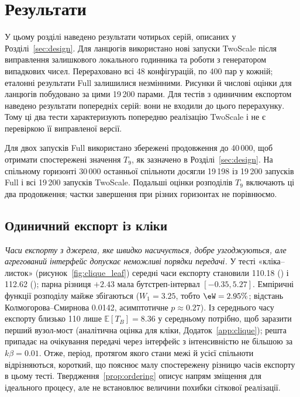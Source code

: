 \section{Результати}
\label{sec:results}

У цьому розділі наведено результати чотирьох серій, описаних у Розділі~\ref{sec:design}.
Для ланцюгів використано нові запуски TwoScale після виправлення залишкового локального годинника та роботи з генератором випадкових чисел. Перераховано всі 48 конфігурацій, по 400 пар у кожній; еталонні результати Full залишилися незмінними. Рисунки й числові оцінки для ланцюгів побудовано за цими 19\,200 парами.
Для тестів з одиничним експортом наведено результати попередніх серій: вони не входили до цього перерахунку. Тому ці два тести характеризують попередню реалізацію TwoScale і не є перевіркою її виправленої версії.

Для двох запусків Full використано збережені продовження до 40\,000, щоб отримати спостережені значення $T_9$, як зазначено в Розділі~\ref{sec:design}. На спільному горизонті 30\,000 останньої спільноти досягли 19\,198 із 19\,200 запусків Full і всі 19\,200 запусків TwoScale. Подальші оцінки розподілів $T_9$ включають ці два продовження; частки завершення при різних горизонтах не порівнюємо.

\subsection{Одиничний експорт із кліки}
\label{sec:res_clique}

\emph{Часи експорту з джерела, яке швидко насичується, добре узгоджуються, але агрегований інтерфейс допускає неможливі порядки передачі.} У тесті «кліка--листок» (рисунок~\ref{fig:clique_leaf}) середні часи експорту становили 110.18 (\Full{}) і 112.62 (\TS{}); парна різниця $+2.43$ мала бутстреп-інтервал $[-0.35,5.27]$. Емпіричні функції розподілу майже збігаються ($W_1=3.25$, тобто $\eW=2.95\%$; відстань Колмогорова--Смирнова 0.0142, асимптотичне $p\approx0.27$). Із середнього часу експорту близько 110 лише $\mathbb{E}[T_B]=8.36$ у середньому потрібно, щоб заразити перший вузол-мост (аналітична оцінка для кліки, Додаток~\ref*{app:clique}); решта припадає на очікування передачі через інтерфейс з інтенсивністю не більшою за $k\beta=0.01$. Отже, період, протягом якого стани межі й усієї спільноти відрізняються, короткий, що пояснює малу спостережену різницю часів експорту в цьому тесті. Твердження~\ref{prop:ordering} описує напрям зміщення для ідеального процесу, але не встановлює величини похибки сіткової реалізації.

